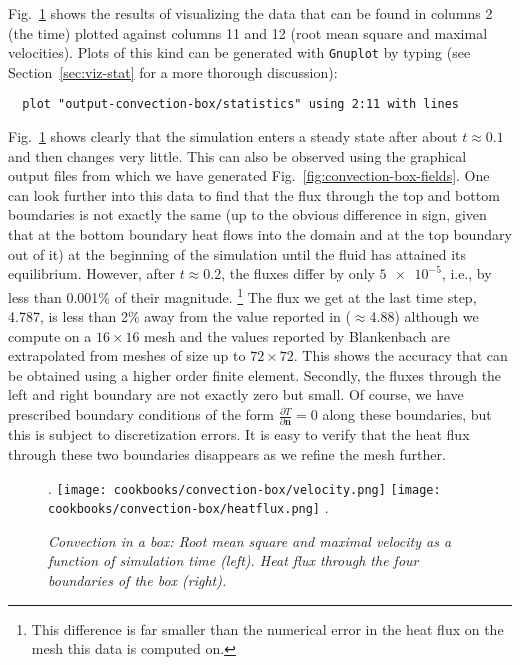 \documentclass{article}
\begin{document}
Fig.~\ref{fig:convection-box-stats} shows the results of visualizing the data
that can be found in columns 2 (the time) plotted against columns 11 and 12
(root mean square and maximal velocities). Plots of this kind can be generated with
\texttt{Gnuplot} by typing (see Section~\ref{sec:viz-stat} for a more thorough
discussion):
\begin{verbatim}
  plot "output-convection-box/statistics" using 2:11 with lines
\end{verbatim}
Fig.~\ref{fig:convection-box-stats} shows clearly that the simulation
enters a steady state after about $t\approx 0.1$ and then changes very little. This can also be observed using the
graphical output files from which we have generated
Fig.~\ref{fig:convection-box-fields}. One can look further into this data to
find that the flux through the top and bottom boundaries is not exactly the same
(up to the obvious difference in sign, given that at the bottom boundary heat
flows into the domain and at the top boundary out of it) at the beginning of the
simulation until the fluid has attained its equilibrium. However, after
$t\approx 0.2$, the fluxes differ by only $\num{5e-5}$, i.e., by less than
0.001\% of their magnitude.%
\footnote{This difference is far smaller than the numerical error in the heat
flux on the mesh this data is computed on.}
The flux we get at the last time step, 4.787, is less than 2\% away from the
value reported in \cite{BBC89} ($\approx$4.88) although we compute on a $16\times 16$ mesh and
the values reported by Blankenbach are extrapolated from meshes of size up to
$72\times 72$. This shows the accuracy that can be obtained using a higher order
finite element. Secondly, the fluxes through the left and right boundary are not
exactly zero but small. Of course, we have prescribed boundary conditions of the
form $\frac{\partial T}{\partial \mathbf n}=0$ along these boundaries, but this
is subject to discretization errors. It is easy to verify that the heat flux
through these two boundaries disappears as we refine the mesh further.

\begin{figure}
\phantom.
\hfill
\texttt{[image: cookbooks/convection-box/velocity.png]}
\hfill
\texttt{[image: cookbooks/convection-box/heatflux.png]}
\hfill
\phantom.
\caption{\it Convection in a box: Root mean square and maximal velocity as a
function of simulation time (left). Heat flux through the four boundaries of
the box (right).}
\label{fig:convection-box-stats}
\end{figure}
\end{document}
